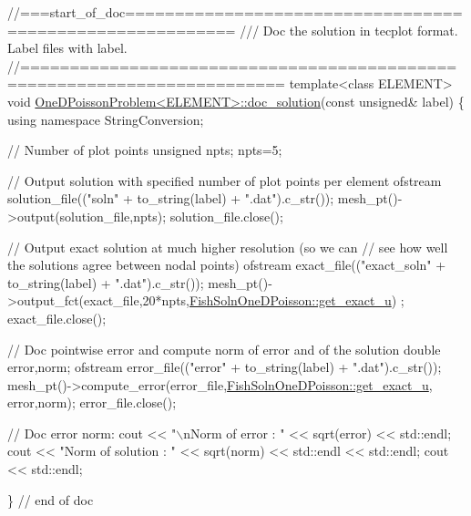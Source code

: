 \begin{DoxyCodeInclude}
\textcolor{comment}{//===start\_of\_doc=========================================================}
\textcolor{comment}{/// Doc the solution in tecplot format. Label files with label.}
\textcolor{comment}{}\textcolor{comment}{//========================================================================}
\textcolor{keyword}{template}<\textcolor{keyword}{class} ELEMENT>
\textcolor{keywordtype}{void} \hyperlink{classOneDPoissonProblem_aaf42d034e42e7615acfa262a9c56b638}{OneDPoissonProblem<ELEMENT>::doc\_solution}(\textcolor{keyword}{const} \textcolor{keywordtype}{unsigned}& 
      label)
\{ 
 \textcolor{keyword}{using namespace }StringConversion;

 \textcolor{comment}{// Number of plot points}
 \textcolor{keywordtype}{unsigned} npts;
 npts=5; 

 \textcolor{comment}{// Output solution with specified number of plot points per element}
 ofstream solution\_file((\textcolor{stringliteral}{"soln"} + to\_string(label) + \textcolor{stringliteral}{".dat"}).c\_str());
 mesh\_pt()->output(solution\_file,npts);
 solution\_file.close();

 \textcolor{comment}{// Output exact solution at much higher resolution (so we can}
 \textcolor{comment}{// see how well the solutions agree between nodal points)}
 ofstream exact\_file((\textcolor{stringliteral}{"exact\_soln"} + to\_string(label) + \textcolor{stringliteral}{".dat"}).c\_str());
 mesh\_pt()->output\_fct(exact\_file,20*npts,\hyperlink{namespaceFishSolnOneDPoisson_a52c9346f567cb68fe20268a592deb4bc}{FishSolnOneDPoisson::get\_exact\_u})
      ; 
 exact\_file.close();

 \textcolor{comment}{// Doc pointwise error and compute norm of error and of the solution}
 \textcolor{keywordtype}{double} error,norm;
 ofstream error\_file((\textcolor{stringliteral}{"error"} + to\_string(label) + \textcolor{stringliteral}{".dat"}).c\_str());
 mesh\_pt()->compute\_error(error\_file,\hyperlink{namespaceFishSolnOneDPoisson_a52c9346f567cb68fe20268a592deb4bc}{FishSolnOneDPoisson::get\_exact\_u},
                          error,norm); 
 error\_file.close();

 \textcolor{comment}{// Doc error norm:}
 cout << \textcolor{stringliteral}{"\(\backslash\)nNorm of error    : "} << sqrt(error) << std::endl; 
 cout << \textcolor{stringliteral}{"Norm of solution : "} << sqrt(norm) << std::endl << std::endl;
 cout << std::endl;

\} \textcolor{comment}{// end of doc}

\end{DoxyCodeInclude}




